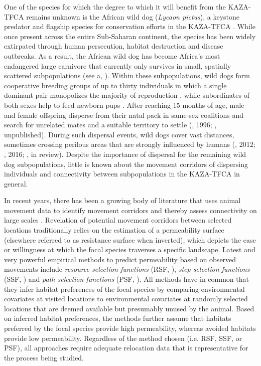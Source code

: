 \documentclass[abstract=on,10pt,a4paper,bibliography=totocnumbered]{scrartcl}
\begin{document}
One of the species for which the degree to which it will benefit from the
KAZA-TFCA remains unknown is the African wild dog (\textit{Lycaon pictus}), a
keystone predator and flagship species for conservation efforts in the KAZA-TFCA
\citep{VanDerMeer.2016}. While once present across the entire Sub-Saharan
continent, the species has been widely extirpated through human persecution,
habitat destruction and disease outbreaks. As a result, the African wild dog has
become Africa's most endangered large carnivore that currently only survives in
small, spatially scattered subpopulations (see a,
\cite{Woodroffe.2012}). Within these subpopulations, wild dogs form cooperative
breeding groups of up to thirty individuals in which a single dominant pair
monopolizes the majority of reproduction \citep{Frame.1979, Fuller.1992,
Creel.2002}, while subordinates of both sexes help to feed newborn pups
\citep{Malcolm.1982}. After reaching 15 months of age, male and female offspring
disperse from their natal pack in same-sex coalitions and search for unrelated
mates and a suitable territory to settle (\citeauthor{McNutt.1996}, 1996;
\citeauthor{Behr.2019}, unpublished). During such dispersal events, wild dogs
cover vast distances, sometimes crossing perilous areas that are strongly
influenced by humans (\citeauthor{DaviesMostert.2012}, 2012;
\citeauthor{Masenga.2016}, 2016; \citeauthor{Cozzi.2019}, in review). Despite
the importance of dispersal for the remaining wild dog subpopulations, little is
known about the movement corridors of dispersing individuals and connectivity
between subpopulations in the KAZA-TFCA in general.

In recent years, there has been a growing body of literature that uses animal
movement data to identify movement corridors and thereby assess connectivity on
large scales \citep{Chetkiewicz.2006}. Revelation of potential movement
corridors between selected locations traditionally relies on the estimation of a
permeability surface (elsewhere referred to as resistance surface when
inverted), which depicts the ease or willingness at which the focal species
traverses a specific landscape. Latest and very powerful empirical methods to
predict permeability based on observed movements include \textit{resource
selection functions} (RSF, \cite{Boyce.2002}), \textit{step selection functions}
(SSF, \cite{Fortin.2005}) and \textit{path selection functions} (PSF,
\cite{Cushman.2010}). All methods have in common that they infer habitat
preferences of the focal species by comparing environmental covariates at
visited locations to environmental covariates at randomly selected locations
that are deemed available but presumably unused by the animal. Based on inferred
habitat preferences, the methods further assume that habitats preferred by the
focal species provide high permeability, whereas avoided habitats provide low
permeability. Regardless of the method chosen (i.e. RSF, SSF, or PSF), all
approaches require adequate relocation data that is representative for the
process being studied.
\end{document}
